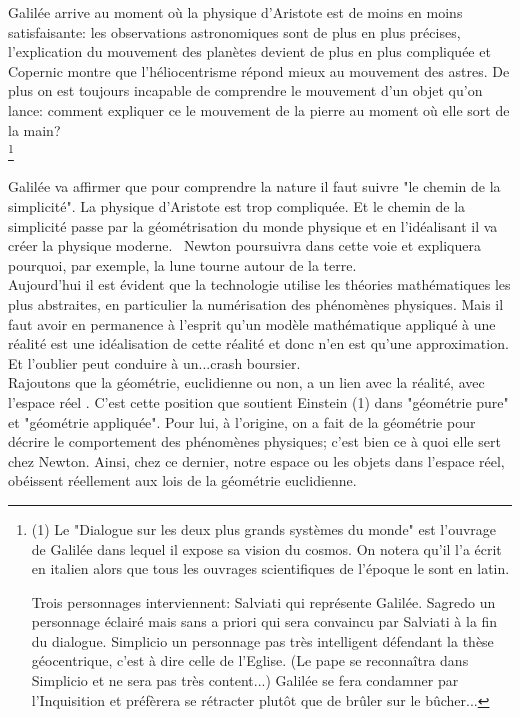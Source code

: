 \documentclass[a4paper, 12pt, twoside]{book}
\begin{document}
Galilée  arrive au moment où la physique d'Aristote est de moins en moins satisfaisante: les observations astronomiques sont de plus en plus précises, l'explication du mouvement des planètes devient de plus en plus compliquée et  Copernic montre que l'héliocentrisme répond mieux au mouvement des astres. De plus on est toujours incapable de comprendre le mouvement d'un objet qu'on lance: comment expliquer ce le mouvement de la pierre au moment où elle  sort de la main? \\
  
  
  
  
  \footnote{ 
  
  (1) Le  "Dialogue sur les deux plus grands systèmes du monde" est l'ouvrage de Galilée dans lequel il expose sa vision du cosmos. On notera qu'il l'a écrit en italien alors que tous les ouvrages scientifiques de l'époque le sont en latin. 

  Trois personnages interviennent:
  Salviati qui représente Galilée.
  Sagredo un personnage éclairé mais sans a priori qui sera convaincu par Salviati à la fin du dialogue.
  Simplicio un personnage pas très intelligent défendant la thèse géocentrique, c'est à dire celle de l'Eglise. (Le pape se reconnaîtra dans Simplicio et ne sera pas très content...)
  Galilée se fera condamner par l'Inquisition et préfèrera se rétracter plutôt que de brûler sur le bûcher...}
  
  
  
  
 
 
   
 
  \newpage Galilée va affirmer que pour comprendre la nature il faut suivre "le chemin de la simplicité". La physique d'Aristote est trop compliquée. Et le chemin de la simplicité passe par la géométrisation du monde physique et en l'idéalisant il va créer la physique moderne. \
  Newton poursuivra dans cette voie et expliquera pourquoi, par exemple, la lune tourne autour de la terre.\\
  
  
  Aujourd'hui il est évident  que la technologie utilise les théories mathématiques les plus abstraites, en particulier la numérisation des phénomènes physiques. Mais il faut avoir en permanence à l'esprit qu'un modèle mathématique appliqué à une réalité est une idéalisation de cette réalité et donc n'en est qu'une approximation. Et l'oublier peut conduire à un...crash boursier.\\
  

   Rajoutons que la géométrie, euclidienne ou non, a un lien avec la réalité, avec l’espace réel . C’est cette position  que soutient Einstein (1) dans "géométrie pure" et "géométrie appliquée". Pour lui, à l’origine, on a fait de la géométrie pour décrire le comportement des phénomènes physiques; c’est bien ce à quoi elle sert chez Newton. Ainsi, chez ce dernier, notre espace ou les objets dans l’espace réel, obéissent réellement aux lois de la géométrie euclidienne. \bigskip
   
\end{document}
